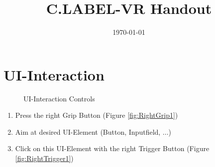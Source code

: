 \documentclass[notitlepage]{article}
\title{C.LABEL-VR Handout}
\date{\today}
\begin{document}
\maketitle



\bigskip
\bigskip
\bigskip
\section{UI-Interaction}
\begin{figure}[H]
   \centering
    \quad
    \caption{UI-Interaction Controls}\label{fig:UI-Interaction}%
\end{figure}

\qquad
\begin{enumerate}
\item Press the right Grip Button (Figure \ref{fig:RightGrip1}) \\
\item Aim at desired UI-Element (Button, Inputfield, ...)\\
\item Click on this UI-Element with the right Trigger Button (Figure \ref{fig:RightTrigger1})
\end{enumerate} 


\end{document}
